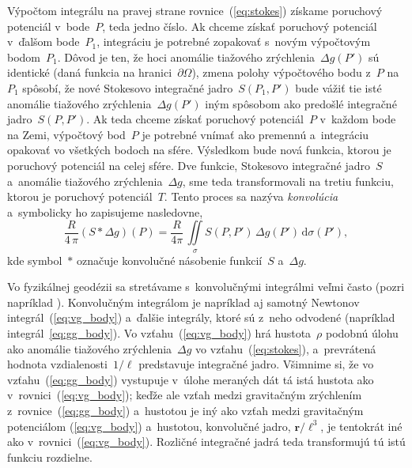 \documentclass[a4paper, 12pt]{book}
\newcommand{\diff}{\mathrm d}
\let\vec\mathbf
\begin{document}
Výpočtom integrálu na pravej strane rovnice~(\ref{eq:stokes}) získame poruchový 
potenciál v~bode~$P$, teda jedno číslo.  Ak chceme získať poruchový potenciál 
v~ďalšom bode~$P_1$, integráciu je potrebné zopakovať s~novým výpočtovým 
bodom~$P_1$.  Dôvod je ten, že hoci anomálie tiažového zrýchlenia~$\Delta 
g(P')$ sú identické (daná funkcia na hranici~$\partial\Omega$), zmena polohy 
výpočtového bodu z~$P$ na~$P_1$ spôsobí, že nové Stokesovo integračné 
jadro~$S(P_1, P')$ bude vážiť tie isté anomálie tiažového zrýchlenia~$\Delta 
g(P')$ iným spôsobom ako predošlé integračné jadro~$S(P, P')$.  Ak teda chceme 
získať poruchový potenciál~$P$ v~každom bode na Zemi, výpočtový bod~$P$ je 
potrebné vnímať ako premennú a~integráciu opakovať vo všetkých bodoch na sfére.  
Výsledkom bude nová funkcia, ktorou je poruchový potenciál na celej sfére.  Dve 
funkcie, Stokesovo integračné jadro~$S$ a~anomálie tiažového zrýchlenia~$\Delta 
g$, sme teda transformovali na tretiu funkciu, ktorou je poruchový 
potenciál~$T$.  Tento proces sa nazýva \emph{konvolúcia} a~symbolicky ho 
zapisujeme nasledovne,
%
\begin{equation}
\label{eq:stokes_convolution}
\frac{R}{4 \, \pi}(S * \Delta g)(P) = \frac{R}{4\pi} \, \iint\limits_\sigma 
S(P, P') \, \Delta g(P') \, \diff\sigma(P'){,}
\end{equation}
%
kde symbol~$*$ označuje konvolučné násobenie funkcií~$S$ a~$\Delta g$.

Vo fyzikálnej geodézii sa stretávame s~konvolučnými integrálmi veľmi často 
(pozri napríklad \cite{Jekeli2017}).  Konvolučným integrálom je napríklad aj 
samotný Newtonov integrál~(\ref{eq:vg_body}) a~ďalšie integrály, ktoré sú 
z~neho odvodené (napríklad integrál~\ref{eq:gg_body}).  Vo 
vzťahu~(\ref{eq:vg_body}) hrá hustota~$\rho$ podobnú úlohu ako anomálie 
tiažového zrýchlenia~$\Delta g$ vo vzťahu~(\ref{eq:stokes}), a~prevrátená 
hodnota vzdialenosti~$1 \slash \ell$ predstavuje integračné jadro.  Všimnime 
si, že vo vzťahu~(\ref{eq:gg_body}) vystupuje v~úlohe meraných dát tá istá 
hustota ako v~rovnici~(\ref{eq:vg_body}); keďže ale vzťah medzi gravitačným 
zrýchlením z~rovnice~(\ref{eq:gg_body}) a~hustotou je iný ako vzťah medzi 
gravitačným potenciálom (\ref{eq:vg_body}) a~hustotou, konvolučné jadro, $\vec 
r \slash \ell^3$, je tentokrát iné ako v~rovnici~(\ref{eq:vg_body}).  Rozličné 
integračné jadrá teda transformujú tú istú funkciu rozdielne.
\end{document}
